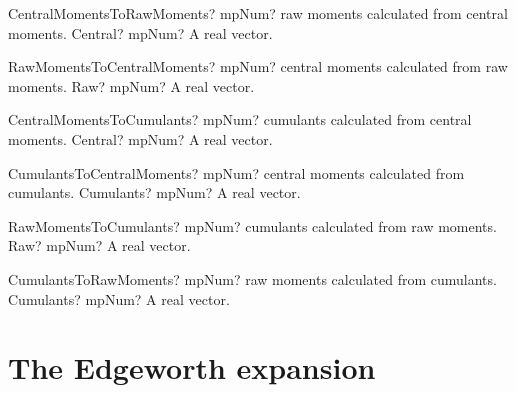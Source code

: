 \vspace{0.6cm}

\begin{mpFunctionsExtract}
	\mpFunctionOneNotImplemented
	{CentralMomentsToRawMoments? mpNum? raw moments calculated from central moments.}
	{Central? mpNum? A real vector.}
\end{mpFunctionsExtract}


\vspace{0.6cm}

\begin{mpFunctionsExtract}
	\mpFunctionOneNotImplemented
	{RawMomentsToCentralMoments? mpNum? central moments calculated from raw moments.}
	{Raw? mpNum? A real vector.}
\end{mpFunctionsExtract}


\vspace{0.6cm}

\begin{mpFunctionsExtract}
	\mpFunctionOneNotImplemented
	{CentralMomentsToCumulants? mpNum? cumulants calculated from central moments.}
	{Central? mpNum? A real vector.}
\end{mpFunctionsExtract}


\vspace{0.6cm}

\begin{mpFunctionsExtract}
	\mpFunctionOneNotImplemented
	{CumulantsToCentralMoments? mpNum? central moments calculated from cumulants.}
	{Cumulants? mpNum? A real vector.}
\end{mpFunctionsExtract}


\vspace{0.6cm}

\begin{mpFunctionsExtract}
	\mpFunctionOneNotImplemented
	{RawMomentsToCumulants? mpNum? cumulants calculated from raw moments.}
	{Raw? mpNum? A real vector.}	
\end{mpFunctionsExtract}


\vspace{0.6cm}

\begin{mpFunctionsExtract}
	\mpFunctionOneNotImplemented
	{CumulantsToRawMoments? mpNum? raw moments calculated from cumulants.}
	{Cumulants? mpNum? A real vector.}
\end{mpFunctionsExtract}





\newpage
\section{The Edgeworth expansion}

